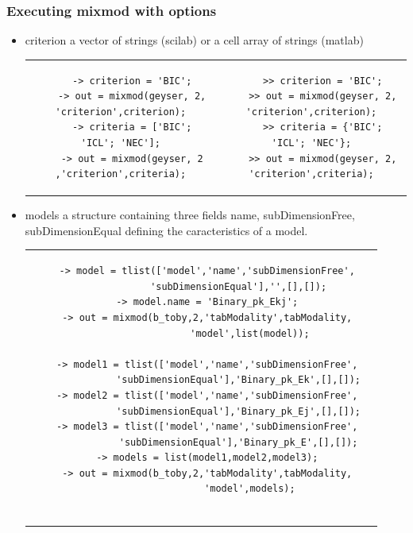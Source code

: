\subsubsection{Executing {\sc mixmod} with options}


\begin{itemize}

\item criterion a vector of strings (scilab) or a cell array of strings (matlab)


\begin{tabular}{c|c}
\begin{minipage}[c]{0.47\columnwidth}%
{\scriptsize
\begin{verbatim}
    -> criterion = 'BIC';
    -> out = mixmod(geyser, 2, 'criterion',criterion);
    -> criteria = ['BIC'; 'ICL'; 'NEC'];
    -> out = mixmod(geyser, 2 ,'criterion',criteria);

\end{verbatim}}
\end{minipage}%
&
\begin{minipage}[c]{0.58\columnwidth}%
{\scriptsize
\begin{verbatim}
    >> criterion = 'BIC';
    >> out = mixmod(geyser, 2, 'criterion',criterion);
    >> criteria = {'BIC'; 'ICL'; 'NEC'};
    >> out = mixmod(geyser, 2, 'criterion',criteria);

\end{verbatim}}
\end{minipage}%
\end{tabular}



\item models a structure containing three fields name, subDimensionFree, subDimensionEqual defining the caracteristics
      of a model.



\begin{tabular}{c|c}
\begin{minipage}[c]{0.5\columnwidth}%
{\scriptsize
\begin{verbatim}
    -> model = tlist(['model','name','subDimensionFree',
               'subDimensionEqual'],'',[],[]);
    -> model.name = 'Binary_pk_Ekj';
    -> out = mixmod(b_toby,2,'tabModality',tabModality,
                   'model',list(model));

    -> model1 = tlist(['model','name','subDimensionFree',
               'subDimensionEqual'],'Binary_pk_Ek',[],[]);
    -> model2 = tlist(['model','name','subDimensionFree',
               'subDimensionEqual'],'Binary_pk_Ej',[],[]);
    -> model3 = tlist(['model','name','subDimensionFree',
               'subDimensionEqual'],'Binary_pk_E',[],[]);
    -> models = list(model1,model2,model3);
    -> out = mixmod(b_toby,2,'tabModality',tabModality,
                   'model',models);


\end{verbatim}}
\end{minipage}
\end{tabular}
\end{itemize}
